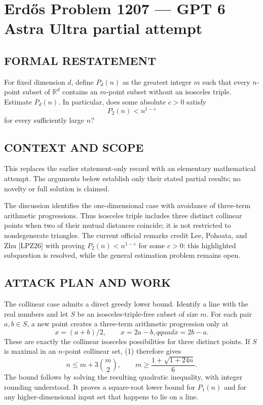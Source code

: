 \section*{Erd\H{o}s Problem 1207 --- GPT 6 Astra Ultra partial attempt}


\subsection*{FORMAL RESTATEMENT}
For fixed dimension $d$, define $P_d(n)$ as the greatest integer $m$ such that every $n$-point subset of $\mathbb R^d$ contains an $m$-point subset without an isosceles triple. Estimate $P_d(n)$. In particular, does some absolute $c>0$ satisfy
\[P_2(n)<n^{1-c}\]
for every sufficiently large $n$?

\subsection*{CONTEXT AND SCOPE}
This replaces the earlier statement-only record with an elementary mathematical attempt. The arguments below establish only their stated partial results; no novelty or full solution is claimed.

The discussion identifies the one-dimensional case with avoidance of three-term arithmetic progressions. Thus isosceles triple includes three distinct collinear points when two of their mutual distances coincide; it is not restricted to nondegenerate triangles. The current official remarks credit Lee, Pohoata, and Zhu [LPZ26] with proving $P_2(n)<n^{1-c}$ for some $c>0$: this highlighted subquestion is resolved, while the general estimation problem remains open.

\subsection*{ATTACK PLAN AND WORK}
The collinear case admits a direct greedy lower bound. Identify a line with
the real numbers and let $S$ be an isosceles-triple-free subset of size $m$.
For each pair $a,b\in S$, a new point creates a three-term arithmetic progression
only at
\[x=(a+b)/2,\qquad x=2a-b,qquad x=2b-a.\tag{1}\]
These are exactly the collinear isosceles possibilities for three distinct points.
If $S$ is maximal in an $n$-point collinear set, (1) therefore gives
\[n\le m+3\binom m2,\qquad
m\ge\frac{1+\sqrt{1+24n}}6.\tag{2}\]
The bound follows by solving the resulting quadratic inequality, with integer
rounding understood. It proves a square-root lower bound for $P_1(n)$ and for
any higher-dimensional input set that happens to lie on a line.

